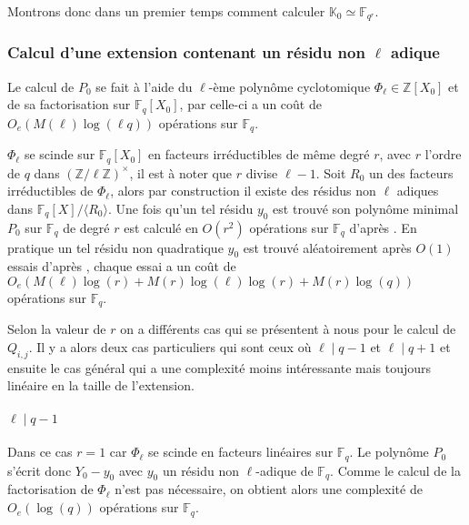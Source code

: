 \documentclass[10pt,a4paper]{book}
\theoremstyle{plain}
\theoremstyle{definition}
\theoremstyle{definition}
\theoremstyle{definition}
\theoremstyle{definition}
\theoremstyle{remark}
\theoremstyle{remark}
\begin{document}
Montrons donc dans un premier temps comment calculer $\mathbb{K}_0 \simeq \mathbb{F}_{q^r}$.



\subsubsection{Calcul d'une extension contenant un résidu non $\ell$ adique}
Le calcul de $P_0$ se fait à l'aide du $\ell$-ème polynôme cyclotomique $\Phi_{\ell} \in \mathbb{Z}[X_0]$ et de sa factorisation sur $\mathbb{F}_q[X_0]$, par \cite[Th.9]{Shoup93} celle-ci a un coût de $O_e(M(\ell)\log(\ell q))$ opérations sur $\mathbb{F}_q$.

$\Phi_{\ell}$ se scinde sur $\mathbb{F}_q[X_0]$ en facteurs irréductibles de même degré $r$, avec $r$ l'ordre de $q$ dans $(\mathbb{Z}/\ell \mathbb{Z})^{\times}$, il est à noter que $r$ divise $\ell-1$. Soit $R_0$ un des facteurs irréductibles de $\Phi_{\ell}$, alors par construction il existe des résidus non $\ell$ adiques dans $\mathbb{F}_q[X]/\langle R_0 \rangle$. Une fois qu'un tel résidu $y_0$ est trouvé son polynôme minimal $P_0$ sur $\mathbb{F}_q$ de degré $r$ est calculé en $O(r^2)$ opérations sur $\mathbb{F}_q$ d'après \cite[Th.4]{Shoup93}. 
En pratique un tel résidu non quadratique $y_0$ est trouvé aléatoirement après $O(1)$ essais d'après \cite[Lemma 15]{Shoup93}, chaque essai a un coût de $O_e(M(\ell)\log(r)+M(r)\log(\ell)\log(r)+M(r)\log(q))$ opérations sur $\mathbb{F}_q$.

Selon la valeur de $r$ on a différents cas qui se présentent à nous pour le calcul de $Q_{i,j}$. Il y a alors deux cas particuliers qui sont ceux où $\ell \mid q-1$ et $\ell \mid q+1$ et ensuite le cas général qui a une complexité moins intéressante mais toujours linéaire en la taille de l'extension.

\paragraph{\boldmath $\ell \mid q-1$}\label{par:easycase}
Dans ce cas $r=1$ car $\Phi_{\ell}$ se scinde en facteurs linéaires sur $\mathbb{F}_q$. Le polynôme $P_0$ s'écrit donc $Y_0-y_0$ avec $y_0$ un résidu non $\ell$-adique de $\mathbb{F}_q$. Comme le calcul de la factorisation de $\Phi_{\ell}$ n'est pas nécessaire, on obtient alors une complexité de $O_e(\log(q))$ opérations sur $\mathbb{F}_q$.
\end{document}
